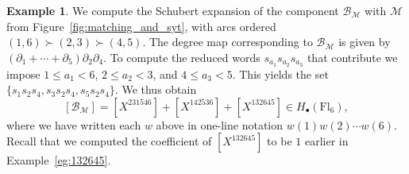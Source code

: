 \documentclass[11pt]{amsart}
\theoremstyle{definition}
\newtheorem{eg}[thm]{Example}
\numberwithin{equation}{section}
\newcommand{\fl}[1]{\mathrm{Fl}_{#1}}
\begin{document}
\begin{eg}\label{eg:running}
    We compute the Schubert expansion of the component $\mathcal{B}_{\mathcal{M}}$ with $\mathcal{M}$ from
    Figure~\ref{fig:matching_and_syt}, with arcs ordered $(1,6)\succ(2,3)\succ(4,5)$.
The degree map corresponding to $\mathcal{B}_\mathcal{M}$ is given by $(\partial_1+\cdots+\partial_5)\partial_2\partial_4$.
To compute the reduced words $s_{a_1}s_{a_2}s_{a_3}$ that contribute we impose $1\leq a_1<6$, $2\leq a_2<3$, and $4\leq a_3<5$.
This yields the set $\{s_1s_2s_4, s_3s_2s_4,s_5s_2s_4\}$.
We thus obtain
\[
    [\mathcal{B}_\mathcal{M}]=[X^{231546}]+[X^{142536}]+[X^{132645}]\in H_\bullet(\fl{6}),
\]
where we have written each $w$ above in one-line notation $w(1)w(2)\cdots w(6)$. Recall that we computed the coefficient of $[X^{132645}]$ to be $1$ earlier in Example~\ref{eg:132645}.
\end{eg}
\end{document}
